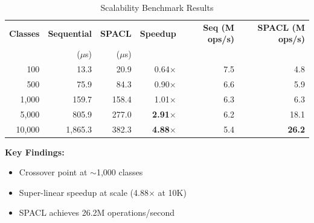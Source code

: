 \begin{table}[h]
\centering
\caption{Scalability Benchmark Results}
\label{tab:scalability}
\begin{tabular}{r|r|r|r|r|r}
\toprule
\textbf{Classes} & \textbf{Sequential} & \textbf{SPACL} & \textbf{Speedup} & \textbf{Seq (M ops/s)} & \textbf{SPACL (M ops/s)} \\
 & ($\mu$s) & ($\mu$s) & & & \\
\midrule
100 & 13.3 & 20.9 & 0.64$\times$ & 7.5 & 4.8 \\
500 & 75.9 & 84.3 & 0.90$\times$ & 6.6 & 5.9 \\
1,000 & 159.7 & 158.4 & 1.01$\times$ & 6.3 & 6.3 \\
5,000 & 805.9 & 277.0 & \textbf{2.91$\times$} & 6.2 & 18.1 \\
10,000 & 1,865.3 & 382.3 & \textbf{4.88$\times$} & 5.4 & \textbf{26.2} \\
\bottomrule
\end{tabular}
\end{table}

\textbf{Key Findings:}
\begin{itemize}
    \item Crossover point at $\sim$1,000 classes
    \item Super-linear speedup at scale (4.88$\times$ at 10K)
    \item SPACL achieves 26.2M operations/second
\end{itemize}

